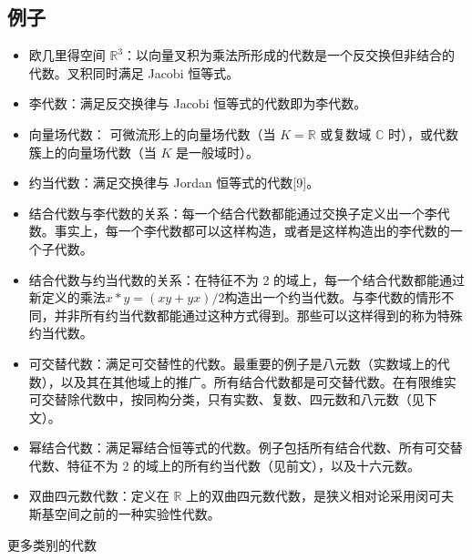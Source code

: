 \subsection{例子}
\begin{itemize}
\item 欧几里得空间 $\mathbb{R}^3$：以向量叉积为乘法所形成的代数是一个反交换但非结合的代数。叉积同时满足 Jacobi 恒等式。
\item 李代数：满足反交换律与 Jacobi 恒等式的代数即为李代数。
\item 向量场代数：
  可微流形上的向量场代数（当 $K=\mathbb{R}$ 或复数域 $\mathbb{C}$ 时），或代数簇上的向量场代数（当 $K$ 是一般域时）。
\item 约当代数：满足交换律与 Jordan 恒等式的代数[9]。
\item 结合代数与李代数的关系：每一个结合代数都能通过交换子定义出一个李代数。事实上，每一个李代数都可以这样构造，或者是这样构造出的李代数的一个子代数。
\item 结合代数与约当代数的关系：在特征不为 2 的域上，每一个结合代数都能通过新定义的乘法$x * y = (xy + yx)/2$构造出一个约当代数。与李代数的情形不同，并非所有约当代数都能通过这种方式得到。那些可以这样得到的称为特殊约当代数。
\item 可交替代数：满足可交替性的代数。最重要的例子是八元数（实数域上的代数），以及其在其他域上的推广。所有结合代数都是可交替代数。在有限维实可交替除代数中，按同构分类，只有实数、复数、四元数和八元数（见下文）。
\item 幂结合代数：满足幂结合恒等式的代数。例子包括所有结合代数、所有可交替代数、特征不为 2 的域上的所有约当代数（见前文），以及十六元数。
\item 双曲四元数代数：定义在 $\mathbb{R}$ 上的双曲四元数代数，是狭义相对论采用闵可夫斯基空间之前的一种实验性代数。
\end{itemize}
更多类别的代数
